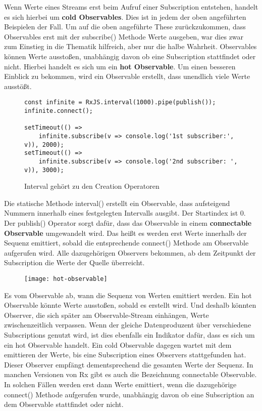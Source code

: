\noindent
Wenn Werte eines Streams erst beim Aufruf einer Subscription entstehen, handelt es sich hierbei um \textbf{cold Observables}.\cite{hot-vs-cold} Dies ist in jedem der oben angeführten Beispielen der Fall. Um auf die oben angeführte These zurückzukommen, dass Observables erst mit der subscribe() Methode Werte ausgeben, war dies zwar zum Einstieg in die Thematik hilfreich, aber nur die halbe Wahrheit. Observables können Werte ausstoßen, unabhängig davon ob eine Subscription stattfindet oder nicht. Hierbei handelt es sich um ein \textbf{hot Observable}. Um einen besseren Einblick zu bekommen, wird ein Observable erstellt, dass unendlich viele Werte ausstößt.

\begin{figure}[H]
\begin{lstlisting}[basicstyle=\small]
const infinite = RxJS.interval(1000).pipe(publish());
infinite.connect();

setTimeout(() =>
    infinite.subscribe(v => console.log('1st subscriber:', v)), 2000);
setTimeout(() =>
    infinite.subscribe(v => console.log('2nd subscriber: ', v)), 3000);
\end{lstlisting}
\caption{Interval gehört zu den Creation Operatoren}
\end{figure}

\noindent
Die statische Methode interval() erstellt ein Observable, dass aufsteigend Nummern innerhalb eines festgelegten Intervalls ausgibt. Der Startindex ist 0. Der publish() Operator sorgt dafür, dass das Observable in einem \textbf{connectable Observable} umgewandelt wird. Das heißt es werden erst Werte innerhalb der Sequenz emittiert, sobald die entsprechende connect() Methode am Observable aufgerufen wird. Alle dazugehörigen Observers bekommen, ab dem Zeitpunkt der Subscription die Werte der Quelle überreicht.\\

\begin{figure}[H]
\begin{center}
\texttt{[image: hot-observable]}
\end{center}
\end{figure}

\noindent
Es vom Observable ab, wann die Sequenz von Werten emittiert werden. Ein hot Observable könnte Werte ausstoßen, sobald es erstellt wird. Und deshalb könnten Observer, die sich später am Observable-Stream einhängen, Werte zwischenzeitlich verpassen. Wenn der gleiche Datenproduzent über verschiedene Subscriptions genutzt wird, ist dies ebenfalls ein Indikator dafür, dass es sich um ein hot Observable handelt. Ein cold Observable dagegen wartet mit dem emittieren der Werte, bis eine Subscription eines Observers stattgefunden hat. Dieser Observer empfängt dementsprechend die gesamten Werte der Sequenz. In manchen Versionen von Rx gibt es auch die Bezeichnung connectable Observable. In solchen Fällen werden erst dann Werte emittiert, wenn die dazugehörige connect() Methode aufgerufen wurde, unabhängig davon ob eine Subscription an dem Observable stattfindet oder nicht.\cite{hot-vs-cold-part-2}

